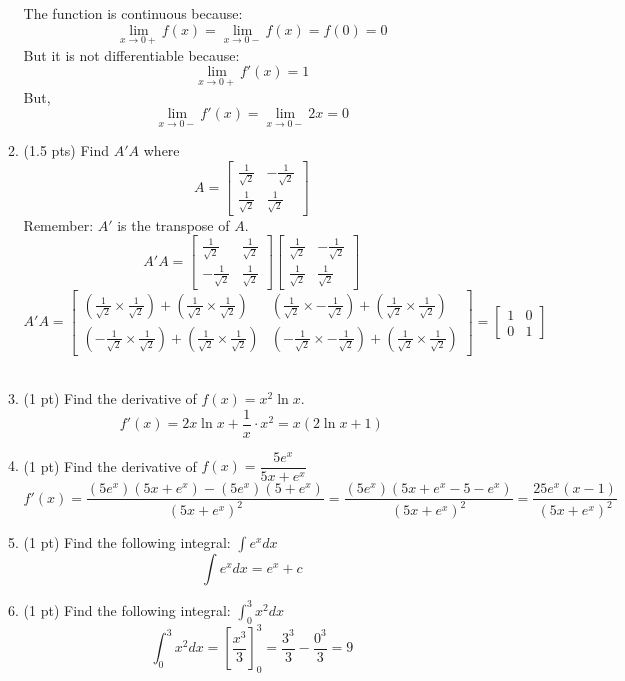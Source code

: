 \documentclass{./../../Latex/tests}
\begin{document}
\begin{enumerate}
\begin{enumerate}
   The function is continuous because:
$$\lim_{x \rightarrow 0+} f(x) = \lim_{x \rightarrow 0-} f(x) = f(0) = 0 $$
But it is not differentiable because:
$$ \lim_{x \rightarrow 0+} f'(x) = 1 $$
But,
$$\lim_{x \rightarrow 0-} f'(x) = \lim_{x \rightarrow 0-} 2x = 0$$
\newpage
\item (1.5 pts) Find $A'A$ where $$ A=\begin{bmatrix}
	\frac{1}{\sqrt{2}} & -\frac{1}{\sqrt{2}} \\ \frac{1}{\sqrt{2}} & \frac{1}{\sqrt{2}}
\end{bmatrix} $$
Remember: $A'$ is the transpose of $A$.
\[
A'A = \begin{bmatrix}
\frac{1}{\sqrt{2}} & \frac{1}{\sqrt{2}} \\
-\frac{1}{\sqrt{2}} & \frac{1}{\sqrt{2}}
\end{bmatrix}
\begin{bmatrix}
\frac{1}{\sqrt{2}} & -\frac{1}{\sqrt{2}} \\
\frac{1}{\sqrt{2}} & \frac{1}{\sqrt{2}}
\end{bmatrix}
\]
\[
A'A = \begin{bmatrix}
\left( \frac{1}{\sqrt{2}} \times \frac{1}{\sqrt{2}} \right) + \left( \frac{1}{\sqrt{2}} \times \frac{1}{\sqrt{2}} \right) & \left( \frac{1}{\sqrt{2}} \times -\frac{1}{\sqrt{2}} \right) + \left( \frac{1}{\sqrt{2}} \times \frac{1}{\sqrt{2}} \right) \\
\left( -\frac{1}{\sqrt{2}} \times \frac{1}{\sqrt{2}} \right) + \left( \frac{1}{\sqrt{2}} \times \frac{1}{\sqrt{2}} \right) & \left( -\frac{1}{\sqrt{2}} \times -\frac{1}{\sqrt{2}} \right) + \left( \frac{1}{\sqrt{2}} \times \frac{1}{\sqrt{2}} \right)
\end{bmatrix} = \begin{bmatrix}
1 & 0 \\
0 & 1
\end{bmatrix}
\] \\

\item (1 pt) Find the derivative of $ f(x) = x^2 \ln x $.
$$ f'(x) = 2x \ln x + \frac{1}{x}\cdot x^2 = x(2 \ln x + 1) $$  \vspace{0.25em}
\item (1 pt) Find the derivative of $f(x) = \dfrac{5e^x}{5x+e^x}$
  \[
f'(x) = \frac{(5e^x)(5x + e^x) - (5e^x)(5 + e^x)}{(5x + e^x)^2} = \frac{(5e^x)(5x + e^x - 5 - e^x)}{(5x + e^x)^2} = \frac{25e^x(x - 1)}{(5x + e^x)^2}
\] \vspace{0.25em}
 \item (1 pt) Find the following integral: $ \int e^x dx $
    $$ \int e^x dx =  e^x + c $$
\item (1 pt) Find the following integral: $ \int_0^3 x^2 dx $
$$ \int_0^3 x^2 dx = \left[\frac{x^3}{3}\right]_{0}^3 = \frac{3^3}{3}-\frac{0^3}{3} = 9 $$
\end{enumerate}


\end{enumerate}
\end{document}
